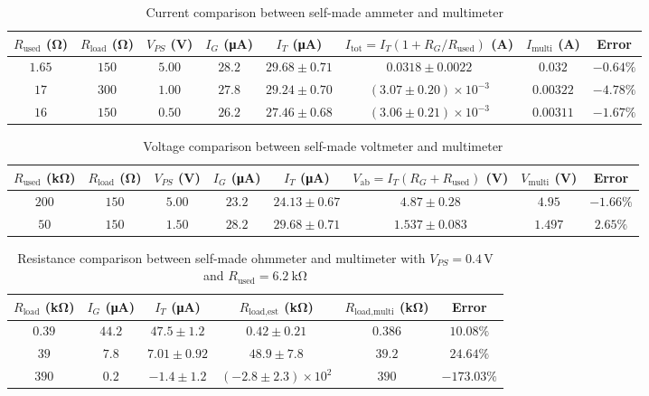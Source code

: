 \begin{table}[htb!]
\centering
\caption{Current comparison between self-made ammeter and multimeter}
\begin{tabular}{cccccccc}
\toprule
$R_{\text{used}}$ (\unit{\ohm}) & $R_{\text{load}}$ (\unit{\ohm}) & $V_{PS}$ (\unit{\V}) & $I_G$ (\unit{\uA}) & $I_T$ (\unit{\uA}) & $I_{\text{tot}}=I_{T}(1+R_{G}/R_{\text{used}})$ (\unit{\A}) & $I_{\text{multi}}$ (\unit{\A}) & Error \\
\midrule
$1.65$ & $150$ & $5.00$ & $28.2$ & $29.68 \pm 0.71$ & $0.0318 \pm 0.0022$ & $0.032$ & $-0.64\%$ \\
$17$ & $300$ & $1.00$ & $27.8$ & $29.24 \pm 0.70$ & $(3.07 \pm 0.20)\times 10^{-3}$ & $0.00322$ & $-4.78\%$ \\
$16$ & $150$ & $0.50$ & $26.2$ & $27.46 \pm 0.68$ & $(3.06 \pm 0.21)\times 10^{-3}$ & $0.00311$ & $-1.67\%$ \\
\bottomrule
\end{tabular}
\end{table}
\begin{table}[htb!]
\centering
\caption{Voltage comparison between self-made voltmeter and multimeter}
\begin{tabular}{cccccccc}
\toprule
$R_{\text{used}}$ (\unit{\kohm}) & $R_{\text{load}}$ (\unit{\ohm}) & $V_{PS}$ (\unit{\V}) & $I_G$ (\unit{\uA}) & $I_T$ (\unit{\uA}) & $V_{\text{ab}}=I_{T}(R_{G}+R_{\text{used}})$ (\unit{\V}) & $V_{\text{multi}}$ (\unit{\V}) & Error \\
\midrule
$200$ & $150$ & $5.00$ & $23.2$ & $24.13 \pm 0.67$ & $4.87 \pm 0.28$ & $4.95$ & $-1.66\%$ \\
$50$ & $150$ & $1.50$ & $28.2$ & $29.68 \pm 0.71$ & $1.537 \pm 0.083$ & $1.497$ & $2.65\%$ \\
\bottomrule
\end{tabular}
\end{table}
\begin{table}[htb!]
\centering
\caption{Resistance comparison between self-made ohmmeter and multimeter with $V_{PS}=0.4\,\mathrm{V}$ and $R_{\text{used}}=\qty{6.2}{\kohm}$}
\begin{tabular}{cccccc}
\toprule
$R_{\text{load}}$ (\unit{\kohm}) & $I_G$ (\unit{\uA}) & $I_T$ (\unit{\uA}) & $R_{\text{load,est}}$ (\unit{\kohm}) & $R_{\text{load,multi}}$ (\unit{\kohm}) & Error \\
\midrule
$0.39$ & $44.2$ & $47.5 \pm 1.2$ & $0.42 \pm 0.21$ & $0.386$ & $10.08\%$ \\
$39$ & $7.8$ & $7.01 \pm 0.92$ & $48.9 \pm 7.8$ & $39.2$ & $24.64\%$ \\
$390$ & $0.2$ & $-1.4 \pm 1.2$ & $(-2.8 \pm 2.3)\times 10^{2}$ & $390$ & $-173.03\%$ \\
\bottomrule
\end{tabular}
\end{table}
